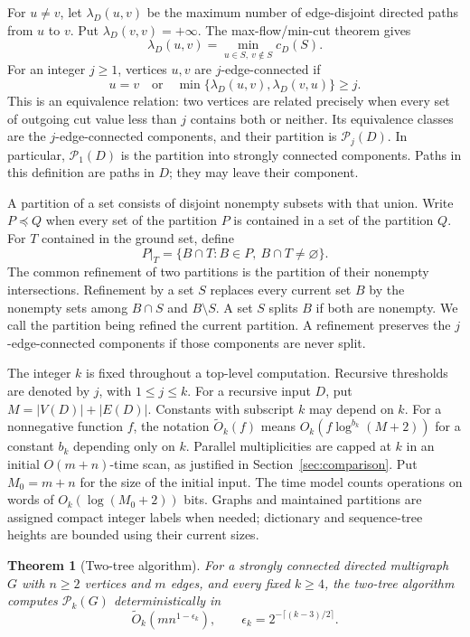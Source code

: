 \documentclass[11pt]{article}
\newtheorem{theorem}{Theorem}[section]
\theoremstyle{definition}
\theoremstyle{remark}
\newcommand{\PP}{\mathcal P}
\newcommand{\OO}{\widetilde O}
\begin{document}
For \(u\ne v\), let \(\lambda_D(u,v)\) be the maximum number of edge-disjoint directed paths from \(u\) to \(v\). Put \(\lambda_D(v,v)=+\infty\). The max-flow/min-cut theorem gives
\begin{equation}
 \lambda_D(u,v)=\min_{u\in S,\ v\notin S}c_D(S).
 \label{eq:menger}
\end{equation}
For an integer \(j\ge1\), vertices \(u,v\) are \(j\)-edge-connected if
\[
 u=v\quad\text{or}\quad
 \min\{\lambda_D(u,v),\lambda_D(v,u)\}\ge j.
\]
This is an equivalence relation: two vertices are related precisely when every set of outgoing cut value less than \(j\) contains both or neither. Its equivalence classes are the \(j\)-edge-connected components, and their partition is \(\PP_j(D)\). In particular, \(\PP_1(D)\) is the partition into strongly connected components. Paths in this definition are paths in \(D\); they may leave their component.

A partition of a set consists of disjoint nonempty subsets with that union. Write \(P\preceq Q\) when every set of the partition \(P\) is contained in a set of the partition \(Q\). For \(T\) contained in the ground set, define
\[
 P|_T=\{B\cap T:B\in P,\ B\cap T\ne\varnothing\}.
\]
The common refinement of two partitions is the partition of their nonempty intersections. Refinement by a set \(S\) replaces every current set \(B\) by the nonempty sets among \(B\cap S\) and \(B\setminus S\). A set \(S\) splits \(B\) if both are nonempty. We call the partition being refined the current partition. A refinement preserves the \(j\)-edge-connected components if those components are never split.

The integer \(k\) is fixed throughout a top-level computation. Recursive thresholds are denoted by \(j\), with \(1\le j\le k\). For a recursive input \(D\), put \(M=|V(D)|+|E(D)|\). Constants with subscript \(k\) may depend on \(k\). For a nonnegative function \(f\), the notation \(\OO_k(f)\) means \(O_k(f\log^{b_k}(M+2))\) for a constant \(b_k\) depending only on \(k\). Parallel multiplicities are capped at \(k\) in an initial \(O(m+n)\)-time scan, as justified in Section~\ref{sec:comparison}. Put \(M_0=m+n\) for the size of the initial input. The time model counts operations on words of \(O_k(\log(M_0+2))\) bits. Graphs and maintained partitions are assigned compact integer labels when needed; dictionary and sequence-tree heights are bounded using their current sizes.

\begin{theorem}[Two-tree algorithm]
\label{thm:slow}
For a strongly connected directed multigraph \(G\) with \(n\ge2\) vertices and \(m\) edges, and every fixed \(k\ge4\), the two-tree algorithm computes \(\PP_k(G)\) deterministically in
\[
 \OO_k\!\left(mn^{1-\epsilon_k}\right),\qquad
 \epsilon_k=2^{-\lceil(k-3)/2\rceil}.
\]
\end{theorem}
\end{document}
